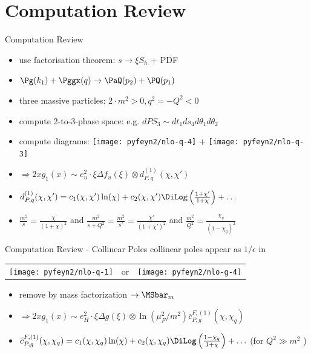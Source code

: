 \section{Computation Review}
\begin{frame}{Computation Review}
\begin{itemize}
\item use factorisation theorem: $s\to \xi S_h$ + PDF
\item $\Pg(k_1) + \Pggx(q) \to \PaQ(p_2) + \PQ(p_1)$
\item three massive particles: $2\cdot m^2>0,q^2=-Q^2<0$
\item compute 2-to-3-phase space: e.g. $dPS_3 \sim dt_1ds_4d\theta_1d\theta_2$
\item compute diagrams: \texttt{[image: pyfeyn2/nlo-q-4]} + \texttt{[image: pyfeyn2/nlo-q-3]}
\item $\Rightarrow 2xg_1(x) \sim e_u^2\cdot \xi\Delta f_u(\xi) \otimes d_{P,q}^{(1)}(\chi,\chi')$
\item $d_{P,q}^{(1)}(\chi,\chi') = c_1(\chi,\chi')\ln(\chi) + c_2(\chi,\chi')\DiLog\left(\frac{1+\chi'}{1+\chi}\right)+\ldots$ \checkmark
\item $\frac{m^2}{s} = \frac{\chi}{(1+\chi)^2}$ and $\frac{m^2}{s+Q^2} = \frac{m^2}{s'} = \frac{\chi'}{(1+\chi')^2}$ and $\frac{m^2}{Q^2} = \frac{\chi_q}{(1-\chi_q)^2}$
\end{itemize}
\end{frame}


\begin{frame}{Computation Review - Collinear Poles}
collinear poles appear as $1/\epsilon$ in
\begin{center}
\begin{tabular}{wnw}
\texttt{[image: pyfeyn2/nlo-q-1]}
&or
&\texttt{[image: pyfeyn2/nlo-g-4]}
\end{tabular}
\end{center}

\begin{itemize}
\item remove by mass factorization $\to \MSbar_m$
\item $\Rightarrow 2xg_1(x) \sim e_H^2\cdot \xi\Delta g(\xi) \otimes \ln(\mu_F^2/m^2) \bar c_{P,g}^{F,(1)}(\chi,\chi_q)$
\item $\bar c_{P,g}^{F,(1)}(\chi,\chi_q) = c_1(\chi,\chi_q)\ln(\chi) + c_2(\chi,\chi_q)\DiLog\left(\frac{1-\chi_q}{1+\chi}\right) + \ldots$ (\checkmark for $Q^2\gg m^2$ )
\end{itemize}
\end{frame}

